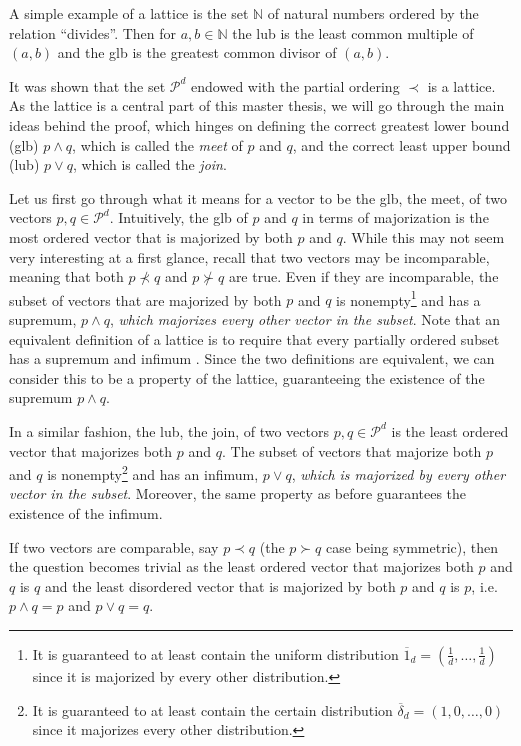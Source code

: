 A simple example of a lattice is the set $\mathbb{N}$ of natural numbers ordered by the relation “divides”. Then for $a, b \in \mathbb{N}$ the lub is the least common multiple of $(a, b)$ and the glb is the greatest common divisor of $(a, b)$. %

It was shown that the set $\mathcal{P}^d$ endowed with the partial ordering $\prec$ is a lattice. As the lattice is a central part of this master thesis, we will go through the main ideas behind the proof, which hinges on defining the correct greatest lower bound (glb) $p \wedge q$, which is called the \textit{meet} of $p$ and $q$, and the correct least upper bound (lub) $p \vee q$, which is called the \textit{join}.

Let us first go through what it means for a vector to be the glb, the meet, of two vectors $p, q \in \mathcal{P}^d$. Intuitively, the glb of $p$ and $q$ in terms of majorization is the most ordered vector that is majorized by both $p$ and $q$. While this may not seem very interesting at a first glance, recall that two vectors may be incomparable, meaning that both $p \nprec q$ and $p \nsucc q$ are true. Even if they are incomparable, the subset of vectors that are majorized by both $p$ and $q$ is nonempty\footnote{It is guaranteed to at least contain the uniform distribution $\overline{1}_d = (\frac{1}{d}, \dots, \frac{1}{d})$ since it is majorized by every other distribution.} and has a supremum, $p \wedge q$, \textit{which majorizes every other vector in the subset}. Note that an equivalent definition of a lattice is to require that every partially ordered subset has a supremum and infimum \cite[p. 19]{marshall_inequalities_2011}. Since the two definitions are equivalent, we can consider this to be a property of the lattice, guaranteeing the existence of the supremum $p \wedge q$.

In a similar fashion, the lub, the join, of two vectors $p, q \in \mathcal{P}^d$ is the least ordered vector that majorizes both $p$ and $q$. The subset of vectors that majorize both $p$ and $q$ is nonempty\footnote{It is guaranteed to at least contain the certain distribution $\overline{\delta}_d = (1, 0, \dots, 0)$ since it majorizes every other distribution.} and has an infimum, $p \vee q$, \textit{which is majorized by every other vector in the subset}. Moreover, the same property as before guarantees the existence of the infimum.

\begin{corollary} \label{cor:comp_meet_join}
    If two vectors are comparable, say $p \prec q$ (the $p \succ q$ case being symmetric), then the question becomes trivial as the least ordered vector that majorizes both $p$ and $q$ is $q$ and the least disordered vector that is majorized by both $p$ and $q$ is $p$, i.e. $p \wedge q = p$ and $p \vee q = q$.
\end{corollary}



